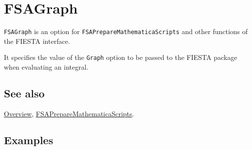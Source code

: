 \documentclass[../FeynHelpersManual.tex]{subfiles}
\begin{document}
\begin{Shaded}
\begin{Highlighting}[]
 
\end{Highlighting}
\end{Shaded}

\hypertarget{fsagraph}{
\section{FSAGraph}\label{fsagraph}}

\texttt{FSAGraph} is an option for \texttt{FSAPrepareMathematicaScripts}
and other functions of the FIESTA interface.

It specifies the value of the \texttt{Graph} option to be passed to the
FIESTA package when evaluating an integral.

\subsection{See also}

\hyperlink{toc}{Overview},
\hyperlink{fsapreparemathematicascripts}{FSAPrepareMathematicaScripts}.

\subsection{Examples}
\end{document}
